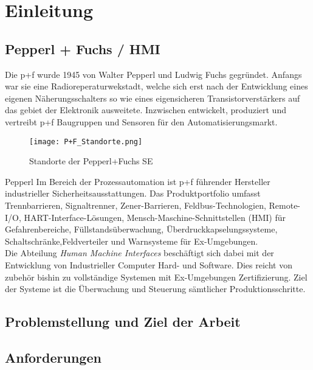 \chapter{Einleitung}
\section{Pepperl + Fuchs / HMI}
Die \ac{p+f} wurde 1945 von Walter Pepperl und Ludwig Fuchs gegründet. Anfangs war sie eine Radioreperaturwekstadt, welche sich erst nach der Entwicklung eines eigenen Näherungsschalters so wie eines eigensicheren Transistorverstärkers auf das gebiet der Elektronik ausweitete. Inzwischen entwickelt, produziert und vertreibt \ac{p+f} Baugruppen und Sensoren für den Automatisierungsmarkt.\\
\begin{flushleft}
    \begin{figure}[h!]
        \centering
        \texttt{[image: P+F\_Standorte.png]}
        \caption{Standorte der Pepperl+Fuchs SE}
        \label{fig:StandortePF}
    \end{figure}
\end{flushleft}
Pepperl
Im Bereich der Prozessautomation ist \ac*{p+f} führender Hersteller industrieller Sicherheitsausstattungen. Das Produktportfolio umfasst Trennbarrieren, Signaltrenner, Zener-Barrieren, Feldbus-Technologien, Remote-I/O, HART-Interface-Lösungen, Mensch-Maschine-Schnittstellen (HMI) für Gefahrenbereiche, Füllstandsüberwachung, Überdruckkapselungssysteme, Schaltschränke,Feldverteiler und Warnsysteme für Ex-Umgebungen.\\
Die Abteilung \textit{Human Machine Interfaces} beschäftigt sich dabei mit der Entwicklung von Industrieller Computer Hard- und Software. Dies reicht von zubehör bishin zu vollständige Systemen mit Ex-Umgebungen Zertifizierung. Ziel der Systeme ist die Überwachung und Steuerung sämtlicher Produktionsschritte.   

\section{Problemstellung und Ziel der Arbeit}

\section{Anforderungen}